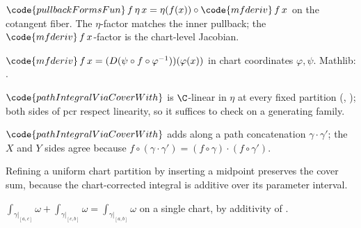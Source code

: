 \begin{lemma}
\label{lem:pcr-r7}
$\code{pullbackFormsFun}\,f\,\eta\,x=\eta(f(x))\circ\code{mfderiv}\,f\,x$
on the cotangent fiber.  The $\eta$-factor matches the inner pullback;
the $\code{mfderiv}\,f\,x$-factor is the chart-level Jacobian.
\leanok
\end{lemma}

\begin{lemma}
\label{lem:pcr-r8}
$\code{mfderiv}\,f\,x = (D(\psi\circ f\circ\varphi^{-1}))(\varphi(x))$
in chart coordinates $\varphi,\psi$. Mathlib:
.
\leanok\mathlibok
\end{lemma}

\begin{lemma}
\label{lem:pcr-r9}
$\code{pathIntegralViaCoverWith}$ is $\C$-linear in $\eta$ at every
fixed partition (,
); both sides of pcr respect
linearity, so it suffices to check on a generating family.
\leanok
\end{lemma}

\begin{lemma}
\label{lem:pcr-r10}
$\code{pathIntegralViaCoverWith}$ adds along a path concatenation
$\gamma\cdot\gamma'$; the $X$ and $Y$ sides agree because
$f\circ(\gamma\cdot\gamma')=(f\circ\gamma)\cdot(f\circ\gamma')$.
\leanok
\end{lemma}

\begin{lemma}
\label{lem:pcr-r11}
Refining a uniform chart partition by inserting a midpoint preserves
the cover sum, because the chart-corrected integral is additive over
its parameter interval.
\leanok
\end{lemma}

\begin{lemma}
\label{lem:pcr-r12}
$\int_{\gamma|_{[a,c]}}\omega+\int_{\gamma|_{[c,b]}}\omega
=\int_{\gamma|_{[a,b]}}\omega$ on a single chart, by additivity of
.
\leanok\mathlibok
\end{lemma}

